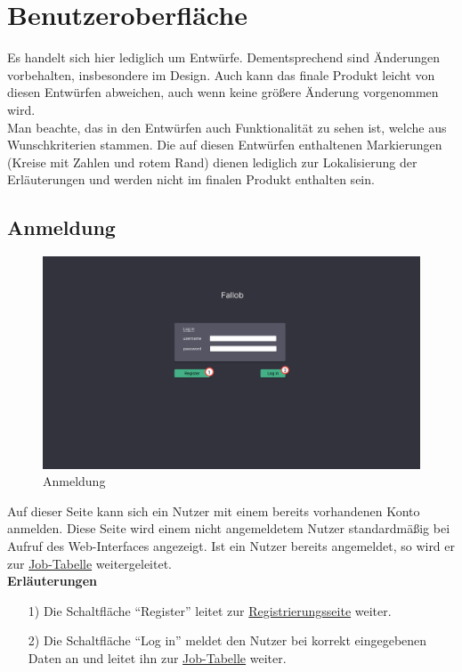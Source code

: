 \section{Benutzeroberfläche}

Es handelt sich hier lediglich um Entwürfe. Dementsprechend sind Änderungen vorbehalten, insbesondere im Design. Auch kann das finale Produkt leicht von diesen Entwürfen abweichen, auch wenn keine größere Änderung vorgenommen wird.\\
Man beachte, das in den Entwürfen auch Funktionalität zu sehen ist, welche aus Wunschkriterien stammen. Die auf diesen Entwürfen enthaltenen Markierungen (Kreise mit Zahlen und rotem Rand) dienen lediglich zur Lokalisierung der Erläuterungen und werden nicht im finalen Produkt enthalten sein.
\subsection{Anmeldung}
\label{pages:login}
\begin{figure}[H]
    \centering
    \includegraphics[width=\textwidth]{images-interface/v4_interface/login_page_4.pdf}
    \caption{Anmeldung}
    \label{fig:login}
\end{figure}
Auf dieser Seite kann sich ein Nutzer mit einem bereits vorhandenen Konto anmelden. Diese Seite wird einem nicht angemeldetem Nutzer standardmäßig bei Aufruf des Web-Interfaces angezeigt. Ist ein Nutzer bereits angemeldet, so wird er zur \hyperref[pages:job-table]{Job-Tabelle} weitergeleitet.\\
\newpage
\textbf{Erläuterungen}
\begin{itemize}
    \item[1)] Die Schaltfläche \enquote{Register} leitet zur \hyperref[pages:register]{Registrierungsseite} weiter.
    \item[2)] Die Schaltfläche \enquote{Log in} meldet den Nutzer bei korrekt eingegebenen Daten an und leitet ihn zur \hyperref[pages:job-table]{Job-Tabelle} weiter.
\end{itemize}

